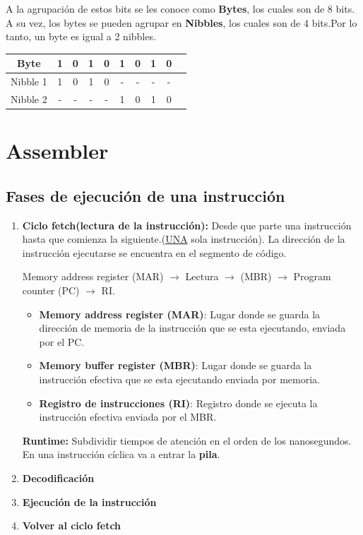 \documentclass{templateNote}
\begin{document}
\noindent A la agrupación de estos bits se les conoce como \textbf{Bytes}, los cuales son de 8 bits. A su vez, los bytes se pueden agrupar en \textbf{Nibbles}, los cuales son de 4 bits.Por lo tanto, un byte es igual a 2 nibbles.
\begin{center}
    \begin{tabular}{|c|c|c|c|c|c|c|c|c|c|}
    \hline
    Byte & 1 & 0 & 1 & 0 & 1 & 0 & 1 & 0 \\
    \hline
    Nibble 1 & 1 & 0 & 1 & 0 & - & - & - & - \\
    Nibble 2 & - & - & - & - & 1 & 0 & 1 & 0 \\
    \hline
    \end{tabular}
\end{center}



\newpage
\section{Assembler}
\subsection{Fases de ejecución de una instrucción}

\begin{enumerate}
    \item \textbf{Ciclo fetch(lectura de la instrucción):} Desde que parte una instrucción hasta que comienza la siguiente.(\underline{UNA} sola instrucción).
    La dirección de la instrucción  ejecutarse se encuentra en el segmento de código.
    
    Memory address register (MAR) $\rightarrow$ Lectura $\rightarrow$ (MBR) $\rightarrow$ Program counter (PC) $\rightarrow$ RI. 
    
    \begin{itemize}
        \item \textbf{Memory address register (MAR)}: Lugar donde se guarda la dirección de memoria de la instrucción que se esta ejecutando, enviada por el PC.
        \item \textbf{Memory buffer register (MBR)}: Lugar donde se guarda la instrucción efectiva que se esta ejecutando enviada por memoria.
        \item \textbf{Registro de instrucciones (RI)}: Registro donde se ejecuta la instrucción efectiva enviada por el MBR.
    \end{itemize}
    
    \begin{tcolorbox}[title=Recordar]
        \begin{center}
            \textbf{Runtime:} Subdividir tiempos de atención en el orden de los nanosegundos.\\
            En una instrucción cíclica va a entrar la \textbf{pila}.
        \end{center}
    \end{tcolorbox}
    \item \textbf{Decodificación}
    \item \textbf{Ejecución de la instrucción}
    \item \textbf{Volver al ciclo fetch
    } 
\end{enumerate}
\end{document}
